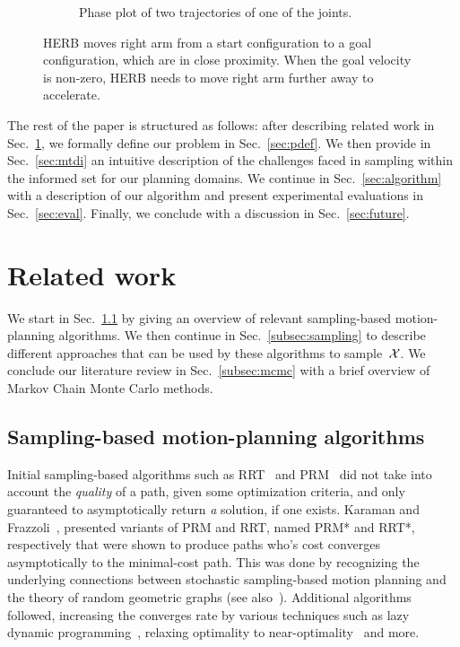 \documentclass[letterpaper, 10 pt, conference]{ieeeconf}  %
\begin{document}
\begin{figure}[t!]
\begin{minipage}[t]{0.35\linewidth}
\begin{subfigure}[c]{\textwidth}
    		\caption{Phase plot of two trajectories of one of the joints.}
    		\label{fig:motivation:phase_plot}
        \end{subfigure}
   	\end{minipage}
	\caption{HERB moves right arm from a start configuration to a goal configuration, which are in close proximity.
    When the goal velocity is non-zero, HERB needs to move right arm further away to accelerate.
	}
	\label{fig:motivation}
\end{figure} 

The rest of the paper is structured as follows: after describing related work in Sec.~\ref{sec:related_work}, we formally define our problem in Sec.~\ref{sec:pdef}.
We then provide in Sec.~\ref{sec:mtdi} an intuitive description of the challenges faced in sampling within the informed set for our planning domains.
We continue in Sec.~\ref{sec:algorithm} with a description of our algorithm and present experimental evaluations in Sec.~\ref{sec:eval}.
Finally, we conclude with a discussion in Sec.~\ref{sec:future}.


\section{Related work}
\label{sec:related_work}
We start in Sec.~\ref{subsec:planning} by giving an overview of relevant sampling-based motion-planning algorithms.
We then continue in Sec.~\ref{subsec:sampling} to describe different approaches that can be used by  these algorithms to sample~$\mathcal{X}$.
We conclude our literature review in Sec.~\ref{subsec:mcmc} with a brief overview of Markov Chain Monte Carlo methods.

\subsection{Sampling-based motion-planning algorithms}
\label{subsec:planning}
Initial sampling-based algorithms such as RRT~\cite{LK01} and PRM~\cite{KSLO96} did not take into account the \emph{quality} of a path, given some optimization criteria, and only guaranteed to asymptotically return \emph{a} solution, if one exists.
Karaman and Frazzoli~\cite{KF11}, presented variants of PRM and RRT, named PRM* and RRT*, respectively that were shown to produce paths who's cost converges asymptotically to the minimal-cost path.
This was done by recognizing the underlying connections between stochastic sampling-based motion planning and the theory of random geometric graphs (see also~\cite{SSH16}).
Additional algorithms followed, increasing the converges rate by various techniques such as 
lazy dynamic programming~\cite{GSB15,SH15},
relaxing optimality to near-optimality~\cite{DB14,SH16} 
and more.
\end{document}
